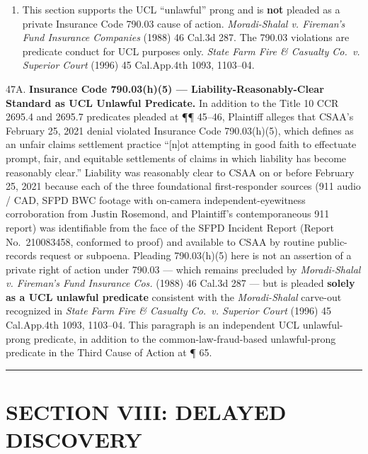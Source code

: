 \begin{enumerate}
\def\labelenumi{\arabic{enumi}.}
\setcounter{enumi}{46}
\tightlist
\item
  This section supports the UCL ``unlawful'' prong and is \textbf{not} pleaded as a private Insurance Code \textsection{} 790.03 cause of action. \emph{Moradi-Shalal v. Fireman's Fund Insurance Companies} (1988) 46 Cal.3d 287. The \textsection{} 790.03 violations are predicate conduct for UCL purposes only. \emph{State Farm Fire \& Casualty Co.~v. Superior Court} (1996) 45 Cal.App.4th 1093, 1103--04.
\end{enumerate}

47A. \textbf{Insurance Code \textsection{} 790.03(h)(5) --- Liability-Reasonably-Clear Standard as UCL Unlawful Predicate.} In addition to the Title 10 CCR \textsection{} 2695.4 and \textsection{} 2695.7 predicates pleaded at ¶¶ 45--46, Plaintiff alleges that CSAA's February 25, 2021 denial violated Insurance Code \textsection{} 790.03(h)(5), which defines as an unfair claims settlement practice ``{[}n{]}ot attempting in good faith to effectuate prompt, fair, and equitable settlements of claims in which liability has become reasonably clear.'' Liability was reasonably clear to CSAA on or before February 25, 2021 because each of the three foundational first-responder sources (911 audio / CAD, SFPD BWC footage with on-camera independent-eyewitness corroboration from Justin Rosemond, and Plaintiff's contemporaneous 911 report) was identifiable from the face of the SFPD Incident Report (Report No.~210083458, conformed to proof) and available to CSAA by routine public-records request or subpoena. Pleading \textsection{} 790.03(h)(5) here is not an assertion of a private right of action under \textsection{} 790.03 --- which remains precluded by \emph{Moradi-Shalal v. Fireman's Fund Insurance Cos.} (1988) 46 Cal.3d 287 --- but is pleaded \textbf{solely as a UCL unlawful predicate} consistent with the \emph{Moradi-Shalal} carve-out recognized in \emph{State Farm Fire \& Casualty Co.~v. Superior Court} (1996) 45 Cal.App.4th 1093, 1103--04. This paragraph is an independent UCL unlawful-prong predicate, in addition to the common-law-fraud-based unlawful-prong predicate in the Third Cause of Action at ¶ 65.

\begin{center}\rule{0.5\linewidth}{0.5pt}\end{center}

\label{toc:section-viii-delayed-discovery}
\section{SECTION VIII: DELAYED DISCOVERY}\label{section-viii-delayed-discovery}

